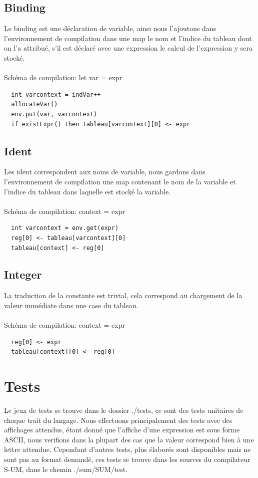 \documentclass[a4paper,12pt]{report}
\begin{document}
\subsection{Binding}
Le binding est une déclaration de variable, ainsi nous l'ajoutons dans l'environnement de compilation dans une map le nom et l'indice
du tableau dont on l'a attribué, s'il est déclaré avec une expression le calcul de l'expression y sera stocké.
\\ \\
Schéma de compilation: let var = expr
\begin{verbatim}
  int varcontext = indVar++
  allocateVar()
  env.put(var, varcontext)
  if existExpr() then tableau[varcontext][0] <- expr
\end{verbatim}

\subsection{Ident}
Les ident correspondent aux noms de variable, nous gardons dans l'environnement de compilation une map contenant le nom de la variable
et l'indice du tableau dans laquelle est stocké la variable.
\\ \\
Schéma de compilation: context = expr
\begin{verbatim}
  int varcontext = env.get(expr)
  reg[0] <- tableau[varcontext][0]
  tableau[context] <- reg[0]
\end{verbatim}


\subsection{Integer}
La traduction de la constante est trivial, cela correspond au chargement de la valeur immédiate dans une case du tableau.
\\ \\
Schéma de compilation: context = expr
\begin{verbatim}
  reg[0] <- expr
  tableau[context][0] <- reg[0]
\end{verbatim}

\section{Tests}
Le jeux de tests se trouve dans le dossier ./tests, ce sont des tests unitaires de chaque trait du langage.
Nous effectuons principalement des tests avec des affichages attendus, étant donné que l'affiche d'une expression est sous forme ASCII,
nous verifions dans la plupart des cas que la valeur correspond bien à une lettre attendue.
Cependant d'autres tests, plus élaborés sont disponibles mais ne sont pas au format demandé, ces tests se trouve dans les sources 
du compilateur S-UM, dans le chemin ./sum/SUM/test.
\end{document}
